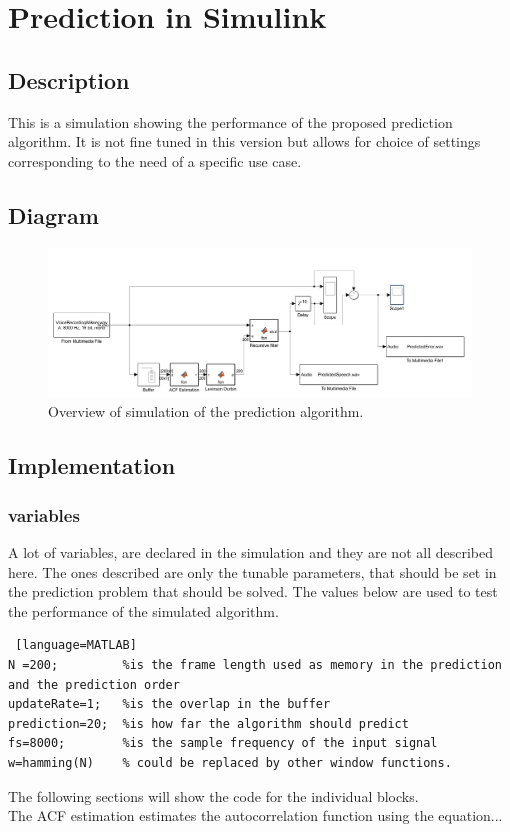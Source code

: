 
\section{Prediction in Simulink}


\subsection{Description}
This is a simulation showing the performance of the proposed prediction algorithm. It is not fine tuned in this version but allows for choice of settings corresponding to the need of a specific use case.  


\subsection{Diagram}
\begin{figure} [h]
	\centering
	\includegraphics[width=\textwidth]{../Journal/Code/SimulinkPrediction}
	\caption{Overview of simulation of the prediction algorithm.}
	\label{Fig:PredictionSimulink}
\end{figure}


\subsection{Implementation}

\subsubsection{variables}
A lot of variables, are declared in the simulation and they are not all described here. The ones described are only the tunable parameters, that should be set in the prediction problem that should be solved. The values below are used to test the performance of the simulated algorithm. 
\begin{lstlisting} [language=MATLAB]
N =200; 		%is the frame length used as memory in the prediction and the prediction order
updateRate=1;	%is the overlap in the buffer
prediction=20;  %is how far the algorithm should predict 
fs=8000; 		%is the sample frequency of the input signal 
w=hamming(N)	% could be replaced by other window functions.
\end{lstlisting}
The following sections will show the code for the individual blocks. \\
The ACF estimation estimates the autocorrelation function using the equation...

